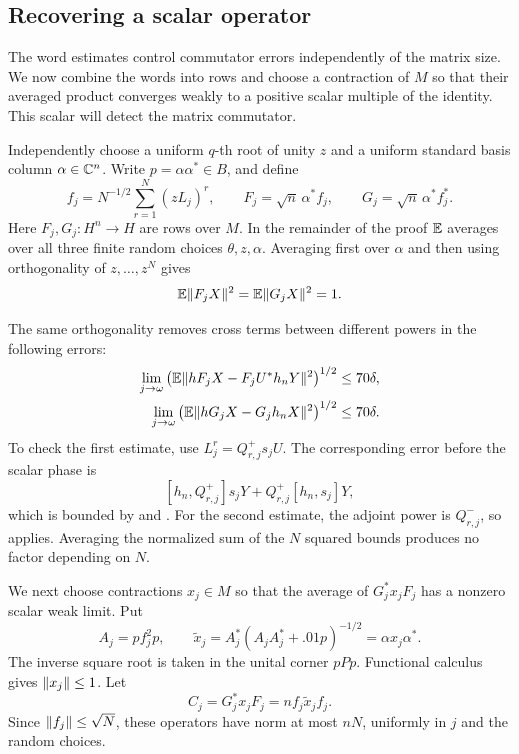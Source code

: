 \subsection{Recovering a scalar operator}

The word estimates control commutator errors independently of the matrix
size. We now combine the words into rows and choose a contraction of
$M$ so that their averaged product converges weakly to a positive scalar
multiple of the identity. This scalar will detect the matrix commutator.

Independently choose a uniform \(q\)-th root of unity \(z\) and
a uniform standard basis column \(\alpha\in\mathbb C^n\).
Write \(p=\alpha\alpha^*\in B\), and define
\[
 f_j=N^{-1/2}\sum_{r=1}^N(zL_j)^r,\qquad
 F_j=\sqrt n\,\alpha^*f_j,\qquad
 G_j=\sqrt n\,\alpha^*f_j^*.
\]
Here \(F_j,G_j:H^n\to H\) are rows over \(M\).
In the remainder of the proof \(\mathbb E\) averages over all three finite
random choices \(\theta,z,\alpha\). Averaging first over \(\alpha\)
and then using orthogonality of \(z,\ldots,z^N\) gives
\begin{equation}\label{eq:row-rms}
 \mathbb E\lVert F_jX\rVert^2=\mathbb E\lVert G_jX\rVert^2=1.
\end{equation}

The same orthogonality removes cross terms between different powers
in the following errors:
\begin{align}
 \lim_{j\to\omega}
 \left(\mathbb E\lVert hF_jX-F_jU^*h_nY\rVert^2\right)^{1/2}
 &\le70\delta,\label{eq:forward-row-drift}\\
 \lim_{j\to\omega}
 \left(\mathbb E\lVert hG_jX-G_jh_nX\rVert^2\right)^{1/2}
 &\le70\delta.\label{eq:backward-row-drift}
\end{align}
To check the first estimate, use \(L_j^r=Q^+_{r,j}s_jU\).
The corresponding error before the scalar phase is
\[
 [h_n,Q^+_{r,j}]s_jY+Q^+_{r,j}[h_n,s_j]Y,
\]
which is bounded by  and
. For the second estimate,
the adjoint power is \(Q^-_{r,j}\), so
 applies. Averaging the normalized sum of
the \(N\) squared bounds produces no factor depending on \(N\).

We next choose contractions \(x_j\in M\) so that the average of
\(G_j^*x_jF_j\) has a nonzero scalar weak limit. Put
\[
 A_j=pf_j^2p,\qquad
 \widetilde x_j=A_j^*(A_jA_j^*+.01p)^{-1/2}
              =\alpha x_j\alpha^*.
\]
The inverse square root is taken in the unital corner \(pPp\).
Functional calculus gives \(\lVert x_j\rVert\le1\). Let
\[
 C_j=G_j^*x_jF_j=nf_j\widetilde x_jf_j.
\]
Since \(\lVert f_j\rVert\le\sqrt N\), these operators have norm at
most \(nN\), uniformly in \(j\) and the random choices.

